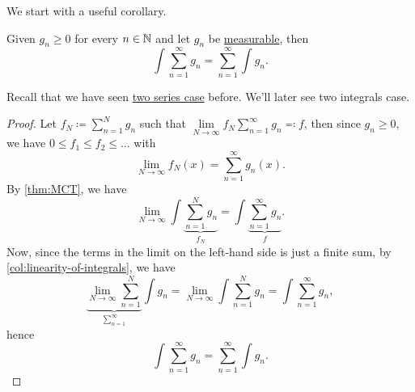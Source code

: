 We start with a useful corollary.
\begin{corollary}\label{thm:Tonelli-theorem-for-series-and-integrals}
	Given \(g_{n}\geq 0\) for every \(n\in\mathbb{\MakeUppercase{n}} \) and let \(g_{n}\) be \hyperref[def:measurable-function]{measurable}, then
	\[
		\int \sum\limits_{n=1}^{\infty} g_{n} = \sum\limits_{n=1}^{\infty} \int g_{n}.
	\]
\end{corollary}
\begin{remark}
	Recall that we have seen \hyperref[thm:Tonelli-theorem-for-series]{two series case} before. We'll later see two integrals case.
\end{remark}
\begin{proof}
	Let \(f_{N} \coloneqq \sum\limits_{n=1}^{N} g_{n}\) such that \(\lim\limits_{N \to \infty} f_{N} \sum\limits_{n=1}^{\infty} g_{n} \eqqcolon f\), then since \(g_{n}\geq 0\), we have \(0\leq f_{1}\leq f_{2}\leq \ldots  \) with
	\[
		\lim\limits_{N \to \infty} f_{N}(x) = \sum\limits_{n=1}^{\infty} g_{n}(x).
	\]
	By \autoref{thm:MCT}, we have
	\[
		\lim\limits_{N \to \infty} \int \underbrace{\sum\limits_{n=1}^N g_{n}}_{f_{N}} = \int \underbrace{\sum\limits_{n=1}^{\infty} g_{n }}_{f}.
	\]
	Now, since the terms in the limit on the left-hand side is just a finite sum, by \autoref{col:linearity-of-integrals}, we have
	\[
		\underbrace{\lim\limits_{N \to \infty} \sum\limits_{n=1}^{N}}_{\sum\limits_{n=1}^{\infty} } \int g_{n} =\lim\limits_{N \to \infty} \int \sum\limits_{n=1}^N g_{n} = \int \sum\limits_{n=1}^{\infty} g_{n},
	\]
	hence
	\[
		\int \sum\limits_{n=1}^{\infty} g_{n} = \sum\limits_{n=1}^{\infty} \int g_{n}.
	\]
\end{proof}

